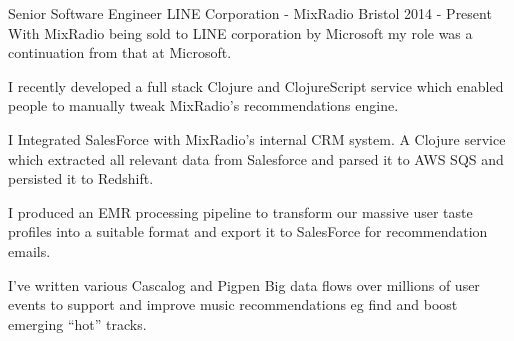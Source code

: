 \begin{cventries}

  \cventrypara
    {Senior Software Engineer} %
    {LINE Corporation - MixRadio} %
    {Bristol} %
    {2014  - Present} %
    {With MixRadio being sold to LINE corporation by Microsoft my role was a continuation from that at Microsoft.}
    {
      \begin{cvitems} %
        \item {I recently developed a full stack Clojure and ClojureScript service which enabled people to manually tweak MixRadio's recommendations engine.}
        \item {I Integrated SalesForce with MixRadio’s internal CRM system. A Clojure service which extracted all relevant data from Salesforce and parsed it to AWS SQS and persisted it to Redshift.}
        \item {I produced an EMR processing pipeline to transform our massive user taste profiles into a suitable format and export it to SalesForce for recommendation emails.}
        \item {I’ve written various Cascalog and Pigpen Big data flows over millions of user events to support and improve music recommendations eg find and boost emerging “hot” tracks.}
      \end{cvitems}
    }


\end{cventries}
